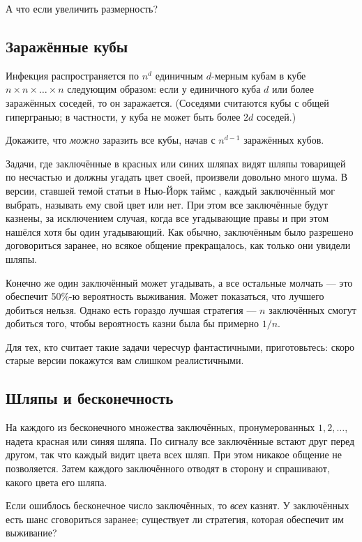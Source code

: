 А что если увеличить размерность?

\subsection*{Заражённые кубы}

Инфекция распространяется по $n^d$ единичным $d$-мерным кубам в кубе $n \times n \times \dots \times n$ следующим образом: если у единичного куба $d$ или более заражённых соседей, то он заражается.
(Соседями считаются кубы с общей гипергранью; в частности, у куба не может быть более $2d$ соседей.)

Докажите, что \emph{можно} заразить все кубы, начав с $n^{d-1}$ заражённых кубов.

\medskip

Задачи, где заключённые в красных или синих шляпах видят шляпы товарищей по несчастью и должны угадать цвет своей, произвели довольно много шума.
В версии, ставшей темой статьи в Нью-Йорк таймс \cite{50}, каждый заключённый мог выбрать, называть ему свой цвет или нет.
При этом все заключённые будут казнены, за исключением случая, когда все угадывающие правы и при этом нашёлся хотя бы один угадывающий.
Как обычно, заключённым было разрешено договориться заранее, но всякое общение прекращалось, как только они увидели шляпы.

Конечно же один заключённый может угадывать, а все остальные молчать --- 
это обеспечит 50\%-ю вероятность выживания. 
Может показаться, что лучшего добиться нельзя.
Однако есть гораздо лучшая стратегия --- $n$ заключённых смогут добиться того, чтобы вероятность казни была бы примерно $1/n$.

Для тех, кто считает такие задачи чересчур фантастичными, приготовьтесь:
скоро старые версии покажутся вам слишком реалистичными.

\subsection*{Шляпы и бесконечность}\label{Шляпы и бесконечность}

На каждого из бесконечного множества заключённых, пронумерованных $1,2,\dots$, надета красная или синяя шляпа.
По сигналу все заключённые встают друг перед другом, так что каждый видит цвета всех шляп.
При этом никакое общение не позволяется.
Затем каждого заключённого отводят в сторону и спрашивают, какого цвета его шляпа.

Если ошиблось бесконечное число заключённых, то \emph{всех} казнят. 
У заключённых есть шанс сговориться заранее;
существует ли стратегия, которая обеспечит им выживание?


